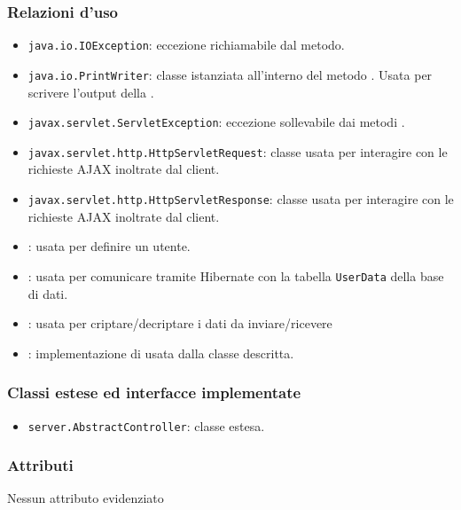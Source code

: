 \subsubsection*{Relazioni d'uso}
\begin{itemize}
	\item \texttt{java.io.IOException}: eccezione richiamabile dal metodo.
	\item \texttt{java.io.PrintWriter}: classe istanziata all'interno del metodo . Usata per scrivere l'output della .
	\item \texttt{javax.servlet.ServletException}: eccezione sollevabile dai metodi .
	\item \texttt{javax.servlet.http.HttpServletRequest}: classe usata per interagire con le richieste AJAX inoltrate dal client.
	\item \texttt{javax.servlet.http.HttpServletResponse}: classe usata per interagire con le richieste AJAX inoltrate dal client.
	\item {}: usata per definire un utente.
	\item {}: usata per comunicare tramite Hibernate con la tabella \texttt{UserData} della base di dati.
	\item {}: usata per criptare/decriptare i dati da inviare/ricevere
	\item {}: implementazione di  usata dalla classe descritta.
	
\end{itemize}

\subsubsection*{Classi estese ed interfacce implementate}
\begin{itemize}
	\item \texttt{server.AbstractController}: classe estesa.
\end{itemize}

\subsubsection*{Attributi}

Nessun attributo evidenziato

